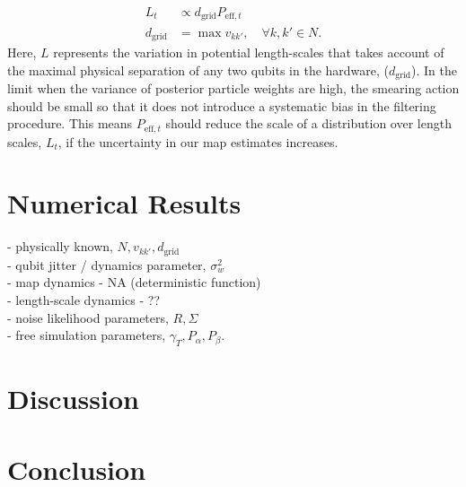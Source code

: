 \begin{align}
L_t & \propto  d_{\mathrm{grid}} P_{\mathrm{eff}, t} \\  
d_{\mathrm{grid}} &= \max v_{k k'}, \quad \forall k, k' \in N.
\end{align}Here, $L$ represents the variation in potential length-scales that takes account of the maximal physical separation of any two qubits in the hardware, ($d_{\mathrm{grid}}$). In the limit when the variance of posterior particle weights are high, the smearing action should be small so that it does not introduce a systematic bias in the filtering procedure. This means $P_{\mathrm{eff}, t} $ should reduce the  scale of a distribution over length scales, $L_t$, if the uncertainty in our map estimates increases. 
\section{Numerical Results}
- physically known, $N, v_{k k'}, d_{\mathrm{grid}}$ \\
- qubit jitter / dynamics parameter, $\sigma^2_w$ \\
- map dynamics - NA (deterministic function)\\
- length-scale dynamics - ?? \\ 
- noise likelihood parameters, $R, \Sigma$ \\
- free simulation parameters, $ \gamma_T, P_\alpha, P_\beta$. \\
\section{Discussion}
\section{Conclusion}
